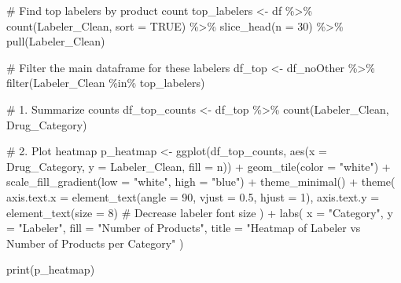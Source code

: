 \documentclass[
  letterpaper,
  DIV=11,
  numbers=noendperiod]{scrartcl}
\newenvironment{Shaded}{\begin{snugshade}}{\end{snugshade}}
\newcommand{\AttributeTok}[1]{\textcolor[rgb]{0.40,0.45,0.13}{#1}}
\newcommand{\CommentTok}[1]{\textcolor[rgb]{0.37,0.37,0.37}{#1}}
\newcommand{\ConstantTok}[1]{\textcolor[rgb]{0.56,0.35,0.01}{#1}}
\newcommand{\DecValTok}[1]{\textcolor[rgb]{0.68,0.00,0.00}{#1}}
\newcommand{\FloatTok}[1]{\textcolor[rgb]{0.68,0.00,0.00}{#1}}
\newcommand{\FunctionTok}[1]{\textcolor[rgb]{0.28,0.35,0.67}{#1}}
\newcommand{\NormalTok}[1]{\textcolor[rgb]{0.00,0.23,0.31}{#1}}
\newcommand{\OtherTok}[1]{\textcolor[rgb]{0.00,0.23,0.31}{#1}}
\newcommand{\SpecialCharTok}[1]{\textcolor[rgb]{0.37,0.37,0.37}{#1}}
\newcommand{\StringTok}[1]{\textcolor[rgb]{0.13,0.47,0.30}{#1}}
\begin{document}
\begin{Shaded}
\begin{Highlighting}[]
\CommentTok{\# Find top labelers by product count}
\NormalTok{top\_labelers }\OtherTok{\textless{}{-}}\NormalTok{ df }\SpecialCharTok{\%\textgreater{}\%}
  \FunctionTok{count}\NormalTok{(Labeler\_Clean, }\AttributeTok{sort =} \ConstantTok{TRUE}\NormalTok{) }\SpecialCharTok{\%\textgreater{}\%}
  \FunctionTok{slice\_head}\NormalTok{(}\AttributeTok{n =} \DecValTok{30}\NormalTok{) }\SpecialCharTok{\%\textgreater{}\%}
  \FunctionTok{pull}\NormalTok{(Labeler\_Clean)}

\CommentTok{\# Filter the main dataframe for these labelers}
\NormalTok{df\_top }\OtherTok{\textless{}{-}}\NormalTok{ df\_noOther }\SpecialCharTok{\%\textgreater{}\%}
  \FunctionTok{filter}\NormalTok{(Labeler\_Clean }\SpecialCharTok{\%in\%}\NormalTok{ top\_labelers)}

\CommentTok{\# 1. Summarize counts}
\NormalTok{df\_top\_counts }\OtherTok{\textless{}{-}}\NormalTok{ df\_top }\SpecialCharTok{\%\textgreater{}\%}
  \FunctionTok{count}\NormalTok{(Labeler\_Clean, Drug\_Category)  }

\CommentTok{\# 2. Plot heatmap}
\NormalTok{p\_heatmap }\OtherTok{\textless{}{-}} \FunctionTok{ggplot}\NormalTok{(df\_top\_counts, }\FunctionTok{aes}\NormalTok{(}\AttributeTok{x =}\NormalTok{ Drug\_Category, }\AttributeTok{y =}\NormalTok{ Labeler\_Clean, }\AttributeTok{fill =}\NormalTok{ n)) }\SpecialCharTok{+}
  \FunctionTok{geom\_tile}\NormalTok{(}\AttributeTok{color =} \StringTok{"white"}\NormalTok{) }\SpecialCharTok{+}
  \FunctionTok{scale\_fill\_gradient}\NormalTok{(}\AttributeTok{low =} \StringTok{"white"}\NormalTok{, }\AttributeTok{high =} \StringTok{"blue"}\NormalTok{) }\SpecialCharTok{+}
  \FunctionTok{theme\_minimal}\NormalTok{() }\SpecialCharTok{+}
  \FunctionTok{theme}\NormalTok{(}
    \AttributeTok{axis.text.x =} \FunctionTok{element\_text}\NormalTok{(}\AttributeTok{angle =} \DecValTok{90}\NormalTok{, }\AttributeTok{vjust =} \FloatTok{0.5}\NormalTok{, }\AttributeTok{hjust =} \DecValTok{1}\NormalTok{),}
    \AttributeTok{axis.text.y =} \FunctionTok{element\_text}\NormalTok{(}\AttributeTok{size =} \DecValTok{8}\NormalTok{) }\CommentTok{\# Decrease labeler font size}
\NormalTok{  ) }\SpecialCharTok{+}
  \FunctionTok{labs}\NormalTok{(}
    \AttributeTok{x =} \StringTok{"Category"}\NormalTok{,}
    \AttributeTok{y =} \StringTok{"Labeler"}\NormalTok{,}
    \AttributeTok{fill =} \StringTok{"Number of Products"}\NormalTok{,}
    \AttributeTok{title =} \StringTok{"Heatmap of Labeler vs Number of Products per Category"}
\NormalTok{  )}


\FunctionTok{print}\NormalTok{(p\_heatmap)}
\end{Highlighting}
\end{Shaded}
\end{document}
